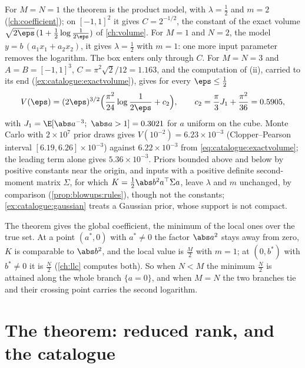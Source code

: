 \begin{refsection}
For $M=N=1$ the theorem is the product model, with $\lambda=\frac12$ and $m=2$ (\cref{ch:coefficient}); on $[-1,1]^2$ it gives $C=2^{-1/2}$, the constant of the exact volume $\sqrt{2\eps}\,(1+\frac12\log\frac1{2\eps})$ of \cref{ch:volume}. For $M=1$ and $N=2$, the model $y=b\,(a_1x_1+a_2x_2)$, it gives $\lambda=\frac12$ with $m=1$: one more input parameter removes the logarithm. The box enters only through $C$. For $M=N=3$ and $A=B=[-1,1]^3$, $C=\pi^2\sqrt2/12=1.163$, and the computation of (ii), carried to its end (\cref{ex:catalogue:exactvolume}), gives for every $\eps\le\frac12$
\begin{equation}\label{eq:catalogue:exactvolume}
V(\eps)=(2\eps)^{3/2}\Bigl(\frac{\pi^2}{24}\log\frac1{2\eps}+c_2\Bigr),\qquad c_2=\frac\pi3J_1+\frac{\pi^2}{36}=0.5905,
\end{equation}
with $J_1=\E[\abs a^{-3};\ \abs a>1]=0.3021$ for $a$ uniform on the cube. Monte Carlo with $2\times10^7$ prior draws gives $V(10^{-2})=6.23\times10^{-3}$ (Clopper--Pearson interval $[6.19,6.26]\times10^{-3}$) against $6.22\times10^{-3}$ from \eqref{eq:catalogue:exactvolume}; the leading term alone gives $5.36\times10^{-3}$. Priors bounded above and below by positive constants near the origin, and inputs with a positive definite second-moment matrix $\Sigma$, for which $K=\frac12\abs b^2a^\top\Sigma a$, leave $\lambda$ and $m$ unchanged, by comparison (\cref{prop:blowups:rules}), though not the constants; \cref{ex:catalogue:gaussian} treats a Gaussian prior, whose support is not compact.

The theorem gives the global coefficient, the minimum of the local ones over the true set. At a point $(a^*,0)$ with $a^*\ne0$ the factor $\abs a^2$ stays away from zero, $K$ is comparable to $\abs b^2$, and the local value is $\frac M2$ with $m=1$; at $(0,b^*)$ with $b^*\ne0$ it is $\frac N2$ (\cref{ch:llc} computes both). So when $N<M$ the minimum $\frac N2$ is attained along the whole branch $\{a=0\}$, and when $M=N$ the two branches tie and their crossing point carries the second logarithm.

\section{The theorem: reduced rank, and the catalogue}\label{sec:catalogue:aoyagi}


\end{refsection}
